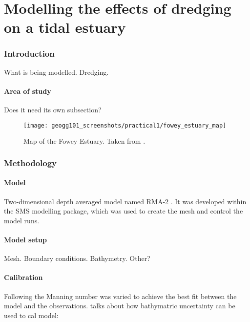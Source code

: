 \documentclass{article}
\begin{document}

\part*{Modelling the effects of dredging on a tidal estuary}

\section{Introduction}

What is being modelled. Dredging.

\subsection{Area of study}

Does it need its own subsection?

\begin{figure}[hbp]
    \centering
    \texttt{[image: geogg101\_screenshots/practical1/fowey\_estuary\_map]}
    \caption{Map of the Fowey Estuary. Taken from \textcite{friend2006sediment}.}
    \label{fig:fowey_estuary}
\end{figure}

\section{Methodology}

\subsection{Model}

Two-dimensional depth averaged model named RMA-2 \parencite{king1990program}. It was developed within the SMS modelling package, which was used to create the mesh and control the model runs.

\subsection{Model setup}

Mesh. Boundary conditions. Bathymetry. Other?


\subsection{Calibration}
Following \textcite{piedra2007residual, sousa2007hydrodynamic} the  Manning number was varied to achieve the best fit between the model and the observations. talks about how bathymatric uncertainty can be used to cal model: \textcite{cea2012bathymetric}
\end{document}
